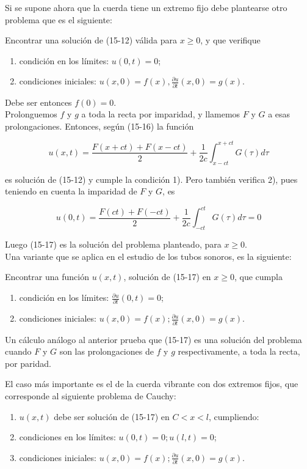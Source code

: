 \documentclass[10pt]{article}
\theoremstyle{plain}
\theoremstyle{definition}
\theoremstyle{remark}
\begin{document}
Si se supone ahora que la cuerda tiene un extremo fijo debe plantearse otro problema que es el siguiente:

Encontrar una solución de (15-12) válida para $x \geqslant 0$, y que verifique

\begin{enumerate}
  \item condición en los límites: $u(0, t)=0$;
  \item condiciones iniciales: $u(x, 0)=f(x), \frac{\partial u}{\partial t}(x, 0)=g(x)$.
\end{enumerate}

Debe ser entonces $f(0)=0$.\\
Prolonguemos $f$ y $g$ a toda la recta por imparidad, y llamemos $F$ y $G$ a esas prolongaciones. Entonces, según (15-16) la función


\begin{equation*}
u(x, t)=\frac{F(x+c t)+F(x-c t)}{2}+\frac{1}{2 c} \int_{x-c t}^{x+c t} G(\tau) d \tau \tag{15-17}
\end{equation*}


es solución de (15-12) y cumple la condición 1). Pero también verifica 2), pues teniendo en cuenta la imparidad de $F$ y $G$, es

$$
u(0, t)=\frac{F(c t)+F(-c t)}{2}+\frac{1}{2 c} \int_{-c t}^{c t} G(\tau) d \tau=0
$$

Luego (15-17) es la solución del problema planteado, para $x \geqslant 0$.\\
Una variante que se aplica en el estudio de los tubos sonoros, es la siguiente:

Encontrar una función $u(x, t)$, solución de (15-17) en $x \geqslant 0$, que cumpla


\begin{enumerate}
  \item condición en los límites: $\frac{\partial u}{\partial t}(0, t)=0$;
  \item condiciones iniciales: $u(x, 0)=f(x) ; \frac{\partial u}{\partial t}(x, 0)=g(x)$.
\end{enumerate}

Un cálculo análogo al anterior prueba que (15-17) es una solución del problema cuando $F$ y $G$ son las prolongaciones de $f$ y $g$ respectivamente, a toda la recta, por paridad.

El caso más importante es el de la cuerda vibrante con dos extremos fijos, que corresponde al siguiente problema de Cauchy:

\begin{enumerate}
  \item $u(x, t)$ debe ser solución de (15-17) en $C<x<l$, cumpliendo:
  \item condiciones en los límites: $u(0, t)=0 ; u(l, t)=0$;
  \item condiciones iniciales: $u(x, 0)=f(x) ; \frac{\partial u}{\partial t}(x, 0)=g(x)$.
\end{enumerate}
\end{document}
